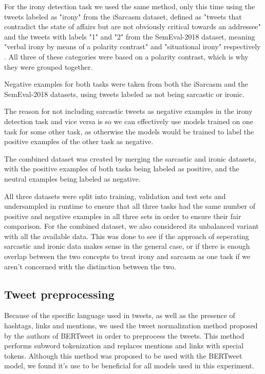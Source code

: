 \documentclass[10pt, a4paper]{article}
\begin{document}
For the irony detection task we used the same method, only this time using the tweets labeled as "irony" from the iSarcasm
dataset, defined as "tweets that contradict the state of affairs but are not obviously critical towards an
addressee" \citep{iSarcasm} and the tweets with labels "1" and "2" from the SemEval-2018 dataset, meaning "verbal irony by means 
of a polarity contrast" and "situational irony" respectively \citep{semeval-2018}. All three of these categories were based
on a polarity contrast, which is why they were grouped together.

Negative examples for both tasks were taken from both the iSarcasm and the SemEval-2018 datasets, using tweets labeled as
not being sarcastic or ironic.

The reason for not including sarcastic tweets as negative examples in the irony detection task and vice versa is so we
can effectively use models trained on one task for some other task, as otherwise the models would be trained
to label the positive examples of the other task as negative.

The combined dataset was created by merging the sarcastic and ironic datasets, with the positive examples of both tasks
being labeled as positive, and the neutral examples being labeled as negative.

All three datasets were split into training, validation and test sets and undersampled in runtime to ensure that all three
tasks had the same number of positive and negative examples in all three sets in order to ensure their fair comparison. For
the combined dataset, we also considered its unbalanced variant with all the available data. This was done to see if the 
approach of seperating sarcastic and ironic data makes sense in the general case, or if there is enough overlap between 
the two concepts to treat irony and sarcasm as one task if we aren't concerned with the distinction between the two.

\subsection{Tweet preprocessing}
Because of the specific language used in tweets, as well as the presence of hashtags, links and mentions, we used the
tweet normalization method proposed by the authors of BERTweet \citep{bertweet} in order to preprocess the tweets. This method
performs subword tokenization and replaces mentions and links with special tokens. Although this method was proposed to be 
used with the BERTweet model, we found it's use to be beneficial for all models used in this experiment.
\end{document}
